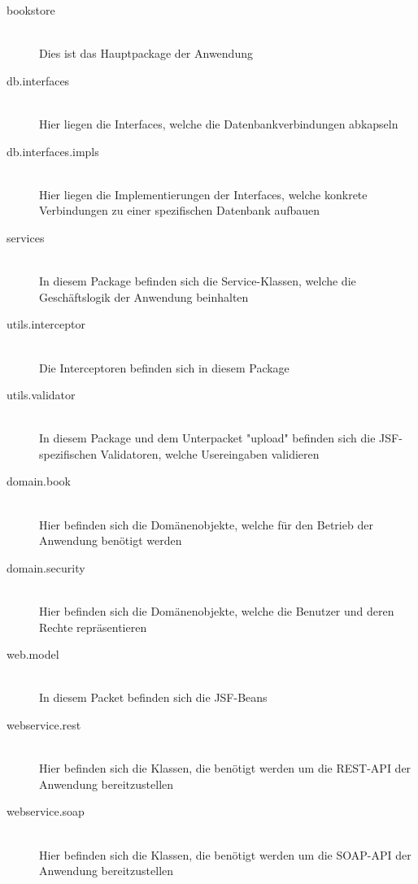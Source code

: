 \documentclass[12pt,a4paper]{book}
\begin{document}
		\begin{description}
			\item[bookstore] \hfill \\
			 Dies ist das Hauptpackage der Anwendung
			 	\item[db.interfaces] \hfill \\
				 	Hier liegen die Interfaces, welche die Datenbankverbindungen abkapseln
			 		\item[db.interfaces.impls] \hfill \\
			 		Hier liegen die Implementierungen der Interfaces, welche konkrete Verbindungen zu einer spezifischen Datenbank aufbauen
			 	\item[services] \hfill \\
			 	In diesem Package befinden sich die Service-Klassen, welche die Geschäftslogik der Anwendung beinhalten
		\item[utils.interceptor] \hfill \\
		Die Interceptoren befinden sich in diesem Package
		\item[utils.validator] \hfill \\
		In diesem Package und dem Unterpacket "upload" befinden sich die JSF-spezifischen Validatoren, welche Usereingaben validieren
		\item[domain.book] \hfill \\
		Hier befinden sich die Domänenobjekte, welche für den Betrieb der Anwendung benötigt werden 
		\item[domain.security] \hfill \\
		Hier befinden sich die Domänenobjekte, welche die Benutzer und deren Rechte repräsentieren
		\item[web.model] \hfill \\
		In diesem Packet befinden sich die JSF-Beans
		\item[webservice.rest] \hfill \\
		Hier befinden sich die Klassen, die benötigt werden um die REST-API der Anwendung bereitzustellen
		\item[webservice.soap] \hfill \\
		Hier befinden sich die Klassen, die benötigt werden um die SOAP-API der Anwendung bereitzustellen
		\end{description}
		
\end{document}
